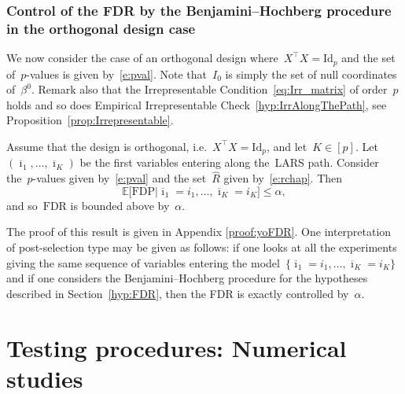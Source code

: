 \documentclass[final,numbib]{imaiai}%
\numberwithin{equation}{section}
\renewcommand{\bar}{\overline}
\renewcommand{\hat}{\widehat}
\newcommand{\<}{\langle}
\renewcommand{\>}{\rangle}
\newcommand{\1}{\mathds{1}}
\begin{document}
{%
\subsubsection{Control of the FDR by the Benjamini–Hochberg procedure in the orthogonal design case}

We now consider the case of an orthogonal design where~$X^\top X=\mathrm{Id}_p$ and the set of~$p$-values
is given by~\eqref{e:pval}.
Note that~$I_0$  is simply the set  of null coordinates of~$\beta^0$.
Remark  also that the Irrepresentable Condition~\eqref{eq:Irr_matrix} of order~$p$ holds and so does Empirical Irrepresentable Check~\eqref{hyp:IrrAlongThePath}, see Proposition~\ref{prop:Irrepresentable}.

\begin{theorem}
 \label{thm:independentTest}
 Assume that the design is orthogonal, i.e.~$X^\top X=\mathrm{Id}_p$, and let~$K\in[p]$.
Let~$(\bar \imath_1,\ldots, \bar \imath_K)$ be the first variables entering along the~LARS path.
Consider the~$p$-values given by~\eqref{e:pval} and the set~$\hat R$ given by~\eqref{e:rchap}.
Then
\[
\mathds E\big[\mathrm{FDP}|\bar\imath_1=i_1,\ldots,\bar\imath_K=i_K\big]\leq\alpha,
\]
and so~$\mathrm{FDR}$ is bounded above by~$\alpha$.
 \end{theorem}
 \noindent
The proof of this result is given in Appendix \ref{proof:yoFDR}. One interpretation of post-selection type may be given as follows: if one looks at all the experiments giving the same sequence of variables entering the model~$\{\bar\imath_1=i_1,\ldots,\bar\imath_K=i_K\}$ and if one considers the Benjamini–Hochberg procedure for the hypotheses described in Section~\ref{hyp:FDR}, then the FDR is exactly controlled by~$\alpha$.

\section{Testing procedures: Numerical studies}
\label{sec:num}
}
\end{document}
